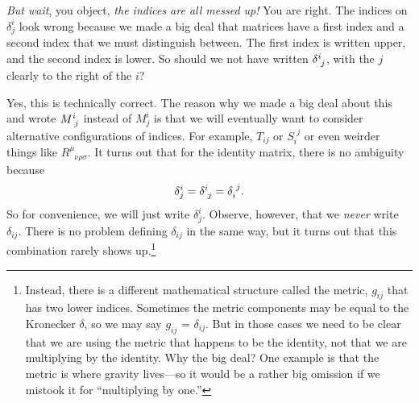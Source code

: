 \documentclass[12pt]{article}
\begin{document}
\emph{But wait}, you object, \emph{the indices are all messed up!} You are right. The indices on $\delta^{i}_j$ look wrong because we made a big deal that matrices have a first index and a second index that we must distinguish between. The first index is written upper, and the second index is lower. So should we not have written $\delta\aij{i}{j}$, with the $j$ clearly to the right of the $i$? 

Yes, this is technically correct. The reason why we made a big deal about this and wrote $M\aij{i}{j}$ instead of $M^i_j$ is that we will eventually want to consider alternative configurations of indices. For example, $T_{ij}$ or $S_i^{\phantom{i}j}$ or even weirder things like $R^\mu_{\phantom{\mu}\nu\rho\sigma}$.  It turns out that for the identity matrix, there is no ambiguity because
\begin{align}
    \delta^i_j = \delta\aij{i}{j} = \delta_i^{\phantom{i}j} .
\end{align}
So for convenience, we will just write $\delta^i_j$. Observe, however, that we \emph{never} write $\delta_{ij}$. There is no problem defining $\delta_{ij}$ in the same way, but it turns out that this combination rarely shows up.\footnote{Instead, there is a different mathematical structure called the metric, $g_{ij}$ that has two lower indices. Sometimes the metric components may be equal to the Kronecker $\delta$, so we may say $g_{ij}$ = $\delta_{ij}$. But in those cases we need to be clear that we are using the metric that happens to be the identity, not that we are multiplying by the identity. Why the big deal? One example is that the metric is where gravity lives---so it would be a rather big omission if we mistook it for ``multiplying by one.''}
\end{document}
